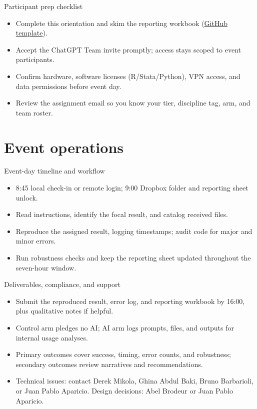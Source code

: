 \documentclass[aspectratio=169,professionalfonts]{beamer}
\begin{document}
\begin{frame}{Participant prep checklist}
  \begin{itemize}
    \item Complete this orientation and skim the reporting workbook (\href{https://github.com/I4Replication/AI-vertical/blob/main/Reports/Replication_Log_Referee_Template.xlsx}{GitHub template}).
    \item Accept the ChatGPT Team invite promptly; access stays scoped to event participants.
    \item Confirm hardware, software licenses (R/Stata/Python), VPN access, and data permissions before event day.
    \item Review the assignment email so you know your tier, discipline tag, arm, and team roster.
  \end{itemize}
\end{frame}

\section{Event operations}

\begin{frame}{Event-day timeline and workflow}
  \begin{itemize}
    \item 8:45 local check-in or remote login; 9:00 Dropbox folder and reporting sheet unlock.
    \item Read instructions, identify the focal result, and catalog received files.
    \item Reproduce the assigned result, logging timestamps; audit code for major and minor errors.
    \item Run robustness checks and keep the reporting sheet updated throughout the seven-hour window.
  \end{itemize}
\end{frame}

\begin{frame}{Deliverables, compliance, and support}
  \begin{itemize}
    \item Submit the reproduced result, error log, and reporting workbook by 16:00, plus qualitative notes if helpful.
    \item Control arm pledges no AI; AI arm logs prompts, files, and outputs for internal usage analyses.
    \item Primary outcomes cover success, timing, error counts, and robustness; secondary outcomes review narratives and recommendations.
    \item Technical issues: contact Derek Mikola, Ghina Abdul Baki, Bruno Barbarioli, or Juan Pablo Aparicio. Design decisions: Abel Brodeur or Juan Pablo Aparicio.
  \end{itemize}
\end{frame}
\end{document}
